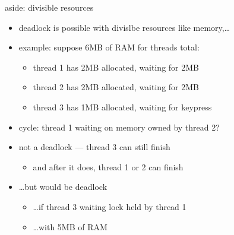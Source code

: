 \begin{frame}{aside: divisible resources}
    \begin{itemize}
    \item deadlock is possible with divislbe resources like memory,\ldots
    \item example: suppose 6MB of RAM for threads total:
        \begin{itemize}
        \item thread 1 has 2MB allocated, waiting for 2MB
        \item thread 2 has 2MB allocated, waiting for 2MB
        \item thread 3 has 1MB allocated, waiting for keypress
        \end{itemize}
    \item cycle: thread 1 waiting on memory owned by thread 2?
    \item not a deadlock --- thread 3 can still finish
        \begin{itemize}
        \item and after it does, thread 1 or 2 can finish
        \end{itemize}
    \item<2-> \ldots but would be deadlock
        \begin{itemize}
            \item \ldots if thread 3 waiting lock held by thread 1
            \item \ldots with 5MB of RAM
        \end{itemize}
    \end{itemize}
\end{frame}

